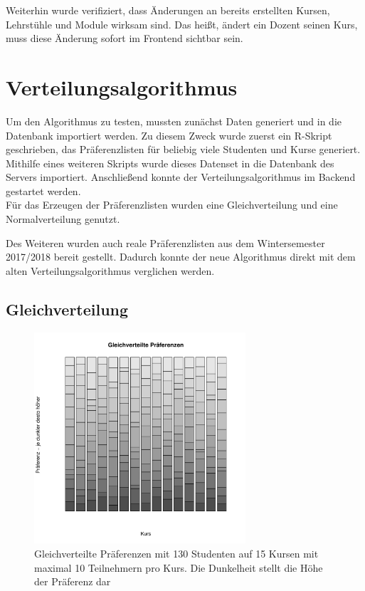 			Weiterhin wurde verifiziert, dass Änderungen an bereits erstellten Kursen, Lehrstühle und Module wirksam sind.
			Das heißt, ändert ein Dozent seinen Kurs, muss diese Änderung sofort im Frontend sichtbar sein.
	
	\section{Verteilungsalgorithmus}
		Um den Algorithmus zu testen, mussten zunächst Daten generiert und in die Datenbank importiert werden.
		Zu diesem Zweck wurde zuerst ein R-Skript geschrieben, das Präferenzlisten für beliebig viele Studenten und Kurse generiert.
		Mithilfe eines weiteren Skripts wurde dieses Datenset in die Datenbank des Servers importiert.
		Anschließend konnte der Verteilungsalgorithmus im Backend gestartet werden.\\
		
		Für das Erzeugen der Präferenzlisten wurden eine Gleichverteilung und eine Normalverteilung genutzt.
    	
        Des Weiteren wurden auch reale Präferenzlisten aus dem Wintersemester 2017/2018 bereit gestellt.
		Dadurch konnte der neue Algorithmus direkt mit dem alten Verteilungsalgorithmus verglichen werden.
		
		\subsection{Gleichverteilung}
	
			\begin{figure}
				\centering
				\includegraphics[width=0.7\textwidth]{./testing/images/EqualDistPreferencesDist.jpg}
				\caption{Gleichverteilte Präferenzen mit 130 Studenten auf 15 Kursen mit maximal 10 Teilnehmern pro Kurs. Die Dunkelheit stellt die Höhe der Präferenz dar}
				\label{fig:test_equal_distribution}
			\end{figure}
        
